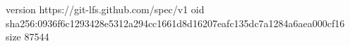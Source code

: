 version https://git-lfs.github.com/spec/v1
oid sha256:0936f6c1293428e5312a294cc1661d8d16207eafc135dc7a1284a6aea000cf16
size 87544
